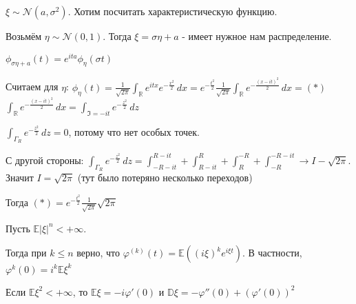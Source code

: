 \begin{example}
    $\xi \sim \mathcal{N}(a, \sigma^2)$. Хотим посчитать характеристическую функцию.

    Возьмём $\eta \sim \mathcal{N}(0, 1)$. Тогда $\xi = \sigma \eta + a$ - имеет нужное нам распределение.

    $\phi_{\sigma \eta + a}(t) = e^{ita} \phi_{\eta} (\sigma t)$

    Считаем для $\eta$: $\phi_{\eta} (t) = \frac{1}{\sqrt{2\pi}} \int_{\mathbb{R}} e^{itx} e^{-\frac{x^2}{2}} \, dx = e^{-\frac{t^2}{2}} \frac{1}{\sqrt{2\pi}} \int_{\mathbb{R}} e^{-\frac{(x - it)^2}{2}} \, dx = (*)$
    $\int_{\mathbb{R}} e^{-\frac{(x - it)^2}{2}} \, dx = \int_{\Im = -it} e^{-\frac{z^2}{2}} \, dz$

    $\int_{\Gamma_R} e^{-\frac{z^2}{2}} \, dz = 0$, потому что нет особых точек. 
    
    С другой стороны:
    $\int_{\Gamma_R} e^{-\frac{z^2}{2}} \, dz = \int_{-R - it}^{R - it} + \int_{R - it}^{R} + \int_{R}^{-R} + \int_{-R}^{-R - it} \rightarrow I - \sqrt{2\pi}$. Значит $I = \sqrt{2\pi}$ (тут было потеряно несколько переходов)

    Тогда $(*) = e^{- \frac{t^2}{2}} \frac{1}{\sqrt{2\pi}} \sqrt{2\pi}$
\end{example}

\begin{theorem}
    Пусть $\mathbb{E} |\xi|^n < +\infty$.
    
    Тогда при $k \leqslant n$ верно, что $\varphi^{(k)} (t) = \mathbb{E} ((i\xi)^k e^{i\xi t}) $. В частности, $\varphi^k (0) = i^k \mathbb{E} \xi^k$
\end{theorem}

\begin{consequence}
    Если $\mathbb{E} \xi^2 < + \infty$, то $\mathbb{E} \xi = -i \varphi'(0)$ и $\mathbb{D} \xi = -\varphi''(0) + (\varphi'(0))^2$
\end{consequence}

